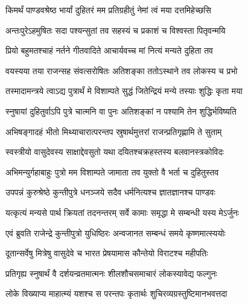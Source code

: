 


\twolineshloka
{किमर्थं पाण्डवश्रेष्ठ भार्यां दुहितरं मम}
{प्रतिग्रहीतुं नेमां त्वं मया दत्तमिहेच्छसि}




\twolineshloka
{अन्तःपुरेऽहमुषितः सदा पश्यन्सुतां तव}
{सहस्यं च प्रकाशं च विश्वस्ता पितृवन्मयि}


\twolineshloka
{प्रियो बहुमतश्चाहं नर्तने गीतवादिते}
{आचार्यवच्च मां नित्यं मन्यते दुहिता तव}


\twolineshloka
{वयस्यया तया राजन्सह संवत्सरोषितः}
{अतिशङ्का ततोऽस्थाने तव लोकस्य च प्रभो}


\twolineshloka
{तस्मादामन्त्रये त्वाऽद्य पुत्रार्थं मे विशाम्पते}
{सुद्धं जितेन्द्रियं मन्ये तस्याः शुद्धिः कृता मया}


\twolineshloka
{स्नुषायां दुहितुर्वाऽपि पुत्रे चात्मनि वा पुनः}
{अतिशङ्कां न पश्यामि तेन शुद्धिर्भविष्यति}


\twolineshloka
{अभिषङ्गादहं भीतो मिथ्याचारात्परन्तप}
{स्रुषार्थमुत्तरां राजन्प्रतिगृह्णामि ते सुताम्}


\twolineshloka
{स्वस्त्रीयो वासुदेवस्य साक्षाद्देवसुतो यथा}
{दयितश्चक्रहस्तस्य बलवानस्त्रकोविदः}


\twolineshloka
{अभिमन्युर्गहाबाहुः पुत्रो मम विशाम्पते}
{जामाता तव युक्तो वै भर्ता च दुहितुस्तव}




\twolineshloka
{उपपन्नं कुरुश्रेष्ठे कुन्तीपुत्रे धनञ्जये}
{सदैव धर्मनित्यश्च ज्ञातज्ञानश्च पाण्डवः}


\twolineshloka
{यत्कृत्यं मन्यसे पार्थ क्रियतां तदनन्तरम्}
{सर्वे कामाः समृद्धा मे सम्बन्धी यस्य मेऽर्जुनः}



\twolineshloka
{एवं ब्रुवति राजेन्द्रे कुन्तीपुत्रो युधिष्ठिरः}
{अन्वजानत सम्बन्धं समये कृष्णमात्स्ययोः}


\twolineshloka
{दूतान्सर्वेषु मित्रेषु वासुदेवे च भारत}
{प्रेषयामास कौन्तेयो विराटश्च महीपतिः}



\twolineshloka
{प्रतिगृह्य स्नुषार्थं वै दर्शयन्व्रतमात्मनः}
{शीलशौचसमाचारं लोकस्यावेद्य फल्गुनः}


\twolineshloka
{लोके विख्याप्य माहात्म्यं यशश्च स परन्तपः}
{कृतार्थः शुचिरव्यग्रस्तुष्टिमानभवत्तदा}




